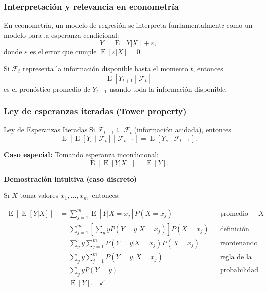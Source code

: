 \documentclass[11pt,a4paper]{article}
\DeclareMathOperator{\E}{E}
\begin{document}
\subsubsection*{Interpretación y relevancia en econometría}

En econometría, un modelo de regresión se interpreta fundamentalmente como un modelo para la esperanza condicional:
\[
Y = \E[Y|X] + \varepsilon,
\]
donde \(\varepsilon\) es el error que cumple \(\E[\varepsilon|X]=0\).

Si \(\mathcal{F}_t\) representa la información disponible hasta el momento \(t\), entonces
\[
\E\left[Y_{t+1}\middle|\mathcal{F}_t\right]
\]
es el pronóstico promedio de \(Y_{t+1}\) usando toda la información disponible.

\subsubsection*{Ley de esperanzas iteradas (Tower property)}

\begin{propiedad}{Ley de Esperanzas Iteradas}
Si \(\mathcal{F}_{t-1}\subseteq\mathcal{F}_t\) (información anidada), entonces
\[
\boxed{\E\left[\E\left[Y_s\middle|\mathcal{F}_t\right]\middle|\mathcal{F}_{t-1}\right]
=\E\left[Y_s\middle|\mathcal{F}_{t-1}\right]}.
\]
\end{propiedad}

\noindent\textbf{Caso especial:} Tomando esperanza incondicional:
\[
\boxed{\E\left[\E[Y|X]\right]=\E[Y]}.
\]

\begin{center}
\textbf{Demostración intuitiva (caso discreto)}

\smallskip
Si \(X\) toma valores \(x_1,\dots,x_m\), entonces:
\end{center}

\[
\begin{aligned}
\E[\E[Y|X]]
&= \sum_{j=1}^{m}\E[Y|X=x_j]P(X=x_j)
&& \text{promedio sobre \(X\)}\\
&= \sum_{j=1}^{m}\left[\sum_y yP(Y=y|X=x_j)\right]P(X=x_j)
&& \text{definición condicional}\\
&= \sum_y y\sum_{j=1}^{m}P(Y=y|X=x_j)P(X=x_j)
&& \text{reordenando}\\
&= \sum_y y\sum_{j=1}^{m}P(Y=y,X=x_j)
&& \text{regla de la cadena}\\
&= \sum_y yP(Y=y)
&& \text{probabilidad total}\\
&= \E[Y]. \quad\checkmark
\end{aligned}
\]
\end{document}
